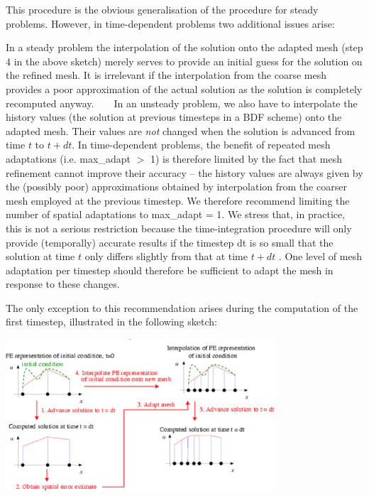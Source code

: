 This procedure is the obvious generalisation of the procedure for steady problems. However, in time-\/dependent problems two additional issues arise\+:
\begin{DoxyEnumerate}
\item In a steady problem the interpolation of the solution onto the adapted mesh (step 4 in the above sketch) merely serves to provide an initial guess for the solution on the refined mesh. It is irrelevant if the interpolation from the coarse mesh provides a poor approximation of the actual solution as the solution is completely recomputed anyway. ~\newline
~\newline
 In an unsteady problem, we also have to interpolate the history values (the solution at previous timesteps in a B\+DF scheme) onto the adapted mesh. Their values are {\itshape not} changed when the solution is advanced from time $ t $ to $ t+ dt. $ In time-\/dependent problems, the benefit of repeated mesh adaptations (i.\+e. {\ttfamily max\+\_\+adapt} $>$ 1) is therefore limited by the fact that mesh refinement cannot improve their accuracy -- the history values are always given by the (possibly poor) approximations obtained by interpolation from the coarser mesh employed at the previous timestep. We therefore recommend limiting the number of spatial adaptations to {\ttfamily max\+\_\+adapt} = 1. We stress that, in practice, this is not a serious restriction because the time-\/integration procedure will only provide (temporally) accurate results if the timestep {\ttfamily dt} is so small that the solution at time $ t $ only differs slightly from that at time $ t + dt $ . One level of mesh adaptation per timestep should therefore be sufficient to adapt the mesh in response to these changes.
\item The only exception to this recommendation arises during the computation of the first timestep, illustrated in the following sketch\+:  
\begin{DoxyImage}
\includegraphics[width=0.75\textwidth]{adapted_ic1}

\end{DoxyImage}
\end{DoxyEnumerate}
